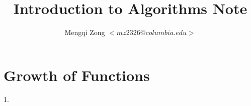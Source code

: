 \documentclass[12pt]{article}
\title{Introduction to Algorithms Note}
\author{Mengqi Zong $<mz2326@columbia.edu>$}
\begin{document}
\maketitle

\setlength{\parindent}{0in}

\section{Growth of Functions}

1. 
\end{document}

